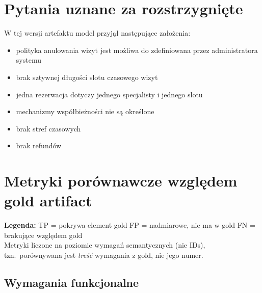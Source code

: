 \documentclass[12pt,a4paper]{article}
\newcommand{\tp}[1]{\colorbox{tpcolor}{\small #1}}
\newcommand{\fp}[1]{\colorbox{fpcolor}{\small #1}}
\newcommand{\fn}[1]{\colorbox{fncolor}{\small #1}}
\begin{document}
\section{Pytania uznane za rozstrzygnięte}

W tej wersji artefaktu model przyjął następujące założenia:

\begin{itemize}[leftmargin=1.5em]
  \item polityka anulowania wizyt jest możliwa do zdefiniowana przez administratora systemu
  \item brak sztywnej długości slotu czasowego wizyt
  \item jedna rezerwacja dotyczy jednego specjalisty i jednego slotu
   \item mechanizmy współbieżności nie są określone
   \item brak stref czasowych
    \item brak refundów
\end{itemize}

\newpage

\section{Metryki porównawcze względem gold artifact}

\begin{mdframed}[backgroundcolor=metabg, linewidth=0pt, innerleftmargin=10pt, innerrightmargin=10pt, innertopmargin=8pt, innerbottommargin=8pt]
\small
\textbf{Legenda:} \tp{TP} = pokrywa element gold \quad \fp{FP} = nadmiarowe, nie ma w gold \quad \fn{FN} = brakujące względem gold\\[0.3em]
Metryki liczone na poziomie wymagań semantycznych (nie IDs), tzn.\ porównywana jest \textit{treść} wymagania z gold, nie jego numer.
\end{mdframed}

\vspace{0.8em}

\subsection{Wymagania funkcjonalne}
\end{document}
